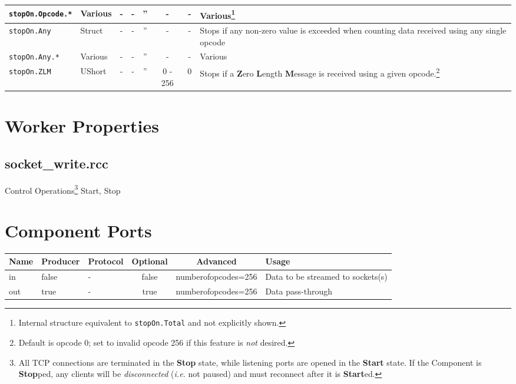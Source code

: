 \documentclass{article}
\def\comp{socket\_write}
\begin{document}
\begin{landscape}
\begin{minipage}{\textwidth}
\begin{scriptsize}
\begin{tabular}{|p{3.2cm}|p{1.5cm}|c|c|c|c|c|p{7cm}|}
      \hline
      \verb+stopOn.Opcode.*+ &
      Various &
      - &
      - &
      '' &
      - &
      - &
      Various\footnote{\label{stopon}Internal structure equivalent to \texttt{stopOn.Total} and not explicitly shown.} \\
      \hline
      \verb+stopOn.Any+ &
      Struct &
      - &
      - &
      '' &
      - &
      - &
      Stops if any non-zero value is exceeded when counting data received using any single opcode \\
      \hline
      \verb+stopOn.Any.*+ &
      Various &
      - &
      - &
      '' &
      - &
      - &
      Various \\
      \hline
      \verb+stopOn.ZLM+ &
      UShort &
      - &
      - &
      '' &
      0 - 256 &
      0 &
      Stops if a \textbf{Z}ero \textbf{L}ength \textbf{M}essage is received using a given opcode.\footnote{Default is opcode 0; set to invalid opcode 256 if this feature is \textit{not} desired.} \\
      \hline
    \end{tabular}
  \end{scriptsize}
  \end{minipage}
  \section*{Worker Properties}
  \subsection*{\comp.rcc}
  Control Operations\footnote{All TCP connections are terminated in the \textbf{Stop} state, while listening ports are opened in the \textbf{Start} state. If the Component is \textbf{Stop}ped, any clients will be \emph{disconnected} (\textit{i.e.} not paused) and must reconnect after it is \textbf{Start}ed.} Start, Stop

  \section*{Component Ports}
  \begin{scriptsize}
    \begin{tabular}{|M{2cm}|M{1.5cm}|M{4cm}|c|c|M{9cm}|}
      \hline
      Name & Producer & Protocol & Optional & Advanced            & Usage \\
      \hline
      in   & false    & -        & false    & numberofopcodes=256 & Data to be streamed to sockets(s) \\
      \hline
      out  & true     & -        & true     & numberofopcodes=256 & Data pass-through \\
      \hline
    \end{tabular}
  \end{scriptsize}


\end{landscape}
\end{document}

